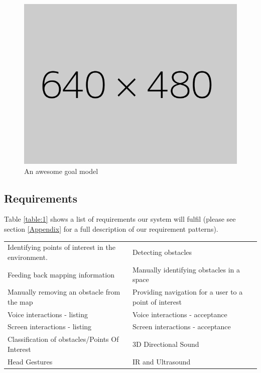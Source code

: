 \documentclass[prodmode,acmtosem]{acmsmall} %
\begin{document}
\begin{figure}
\label{fig:GoalModel}
\centering
\includegraphics[width=\textwidth]{test640}
\caption{An awesome goal model}
\end{figure}


\subsection{Requirements}

Table \ref{table:1} shows a list of requirements our system will fulfil (please see section \ref{Appendix} for a full description of our requirement patterns).\\

\renewcommand{\arraystretch}{1.5}

\begin{center}
\begin{tabularx}{\textwidth}{| X | X |} 
 \hline
 \rowcolor{lightgray}
 \multicolumn{2}{|c|}{List of Requirements} \\ [0.5ex] 
 \hline\hline
 Identifying points of interest in the environment. &  Detecting obstacles \\
 \hline
 Feeding back mapping information &  Manually identifying obstacles in a space \\
 \hline
 Manually removing an obstacle from the map &  Providing navigation for a user to a point of interest \\ 
 \hline
 Voice interactions - listing &  Voice interactions - acceptance \\ 
 \hline
 Screen interactions - listing &  Screen interactions - acceptance \\ 
 \hline
 Classification of obstacles/Points Of Interest &  3D Directional Sound \\ 
 \hline
 Head Gestures &  IR and Ultrasound \\  
 \hline

 \hline
\end{tabularx}
\label{table:requirements}
\end{center}
\end{document}
